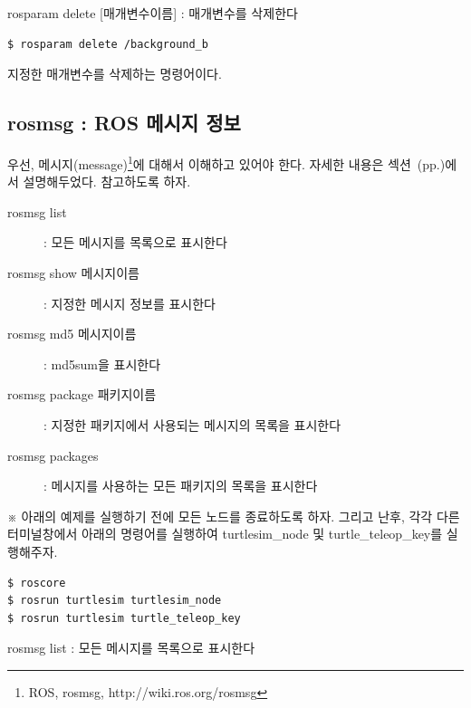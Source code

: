 \vspace{\baselineskip}
\noindent
{}\circled{\thenum} rosparam delete [매개변수이름] : 매개변수를 삭제한다

\begin{lstlisting}[language=ROS]
$ rosparam delete /background_b
\end{lstlisting}

\noindent
지정한 매개변수를 삭제하는 명령어이다.

\newpage
\subsection{rosmsg : ROS 메시지 정보}

우선, 메시지(message)\footnote{ROS, rosmsg, http://wiki.ros.org/rosmsg}에 대해서 이해하고 있어야 한다. 자세한 내용은 섹션~(pp.\pageref{def:RosMessage})에서 설명해두었다. 참고하도록 하자.

\vspace{\baselineskip}
\noindent
\begin{description}
\item[rosmsg list] : 모든 메시지를 목록으로 표시한다
\item[rosmsg show 메시지이름] : 지정한 메시지 정보를 표시한다
\item[rosmsg md5 메시지이름] : md5sum을 표시한다
\item[rosmsg package 패키지이름] : 지정한 패키지에서 사용되는 메시지의 목록을 표시한다
\item[rosmsg packages] : 메시지를 사용하는 모든 패키지의 목록을 표시한다
\end{description}

\vspace{\baselineskip}
\noindent
※ 아래의 예제를 실행하기 전에 모든 노드를 종료하도록 하자. 그리고 난후, 각각 다른 터미널창에서 아래의 명령어를 실행하여 turtlesim\_node 및 turtle\_teleop\_key를 실행해주자.

\begin{lstlisting}[language=ROS]
$ roscore
$ rosrun turtlesim turtlesim_node 
$ rosrun turtlesim turtle_teleop_key
\end{lstlisting}

\setcounter{num}{0}

\vspace{\baselineskip}
\noindent
{}\circled{\thenum} rosmsg list : 모든 메시지를 목록으로 표시한다

